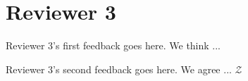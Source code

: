 \section*{Reviewer 3}

\begin{feedback}[1]
Reviewer 3's first feedback goes here.
%
\response
%
We think ...
\end{feedback}

\begin{feedback}[2]
Reviewer 3's second feedback goes here.
%
\response
%
We agree ... $\mathcal{Z}$
\end{feedback}
